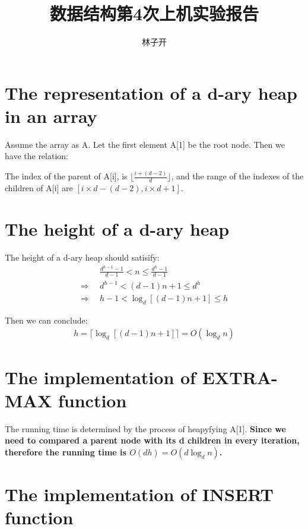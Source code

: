 \documentclass{article}
\title{数据结构第4次上机实验报告}
\author{林子开}
\begin{document}
	\maketitle
	\tableofcontents

\section{The representation of a d-ary heap in an array}
Assume the array as A. Let the first element A[1] be the root node. Then we have the relation:

The index of the parent of A[i], is 
$\lfloor\frac{i+(d-2)}{d}\rfloor$, and the range of the indexes of the children of A[i] are 
$[i\times d -  (d-2), i\times d +1]$.

\section{The height of a d-ary heap}
The height of a d-ary heap should satisify:
\begin{align*}
    &\frac{d^{h-1}-1}{d-1} < n \le \frac{d^{h}-1}{d-1} \\
    \Rightarrow \enspace &d^{h-1} < (d-1)n + 1 \le d^h \\
    \Rightarrow \enspace &h-1 < \log_d[(d-1)n+1] \le h
\end{align*}

Then we can conclude:
\begin{align*}
    h=\lceil \log_d[(d-1)n+1] \rceil = O(\log_d n)
\end{align*} 

\section{The implementation of EXTRA-MAX function}

 

The running time is determined by the process of heapyfying A[1].
\textbf{Since we need to compared a parent node with its d children in every iteration,
therefore the running time is $O(dh) = O(d\log_d n)$.}

\section{The implementation of INSERT function}

 
\end{document}
